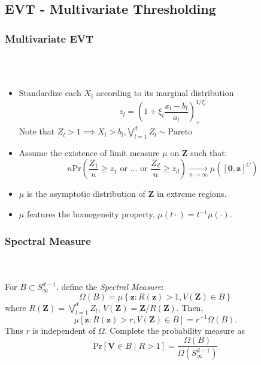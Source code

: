 \documentclass[aspectratio=169]{beamer}
\begin{document}
\subsection{EVT - Multivariate Thresholding}

\begin{frame}
  \frametitle{Multivariate EVT}
  {\scriptsize\cite{ferreira2014}}\\~\vspace{-0.1cm}\\
  \begin{itemize}
    \item Standardize each $X_i$ according to its marginal distribution
        \begin{equation*}
          z_l = \left(1 + \xi_l\frac{x_l - b_{l}}{a_{l}}\right)_{+}^{1/\xi_l}
        \end{equation*}
    Note that $Z_l > 1\implies X_l > b_{l}$,\hspace{1cm}$\bigvee_{l=1}^d Z_l \sim \text{Pareto}$
    \pause
    \item Assume the existence of limit measure $\mu$ on $\bm{Z}$ such that:
    \begin{equation*}
      n\text{Pr}\left(\frac{Z_1}{n} \geq z_1 \text{ or }\ldots\text{ or }\frac{Z_d}{n}\geq z_d\right)
      \xrightarrow[n\to\infty]{} \mu\left([\bm{0}, \bm{z}]^C\right)
    \end{equation*}
    \item $\mu$ is the asymptotic distribution of $\bm{Z}$ in extreme regions.
    \item $\mu$ features the homogeneity property, $\mu(t\cdot) = t^{-1}\mu(\cdot)$.
  \end{itemize}
\end{frame} %

\begin{frame}
  \frametitle{Spectral Measure}
  {\scriptsize\cite{ferreira2014}}\\~\vspace{0.1cm}\\
  For $B \subset S_{\infty}^{d-1}$, define the \emph{Spectral Measure}:
  \begin{equation*}
    \Omega(B) = \mu\left\lbrace\bm{z}: R(\bm {z}) > 1, V(\bm{Z}) \in B\right\rbrace
  \end{equation*}
  where $R(\bm{Z}) = \bigvee_{l = 1}^d Z_l$, $V(\bm{Z}) = \bm{Z} / R(\bm{Z})$.  Then,
  \begin{equation*}
    \mu\left[\bm{z}:R(\bm{z})>r, V(\bm{Z})\in B\right] = r^{-1}\Omega(B).
  \end{equation*}
  Thus $r$ is independent of $\Omega$.  Complete the probability measure as
  \begin{equation*}
    \text{Pr}\left[\bm{V} \in B \mid R > 1\right] = \frac{\Omega(B)}{\Omega(S_{\infty}^{d-1})}
  \end{equation*}
\end{frame}
\end{document}
